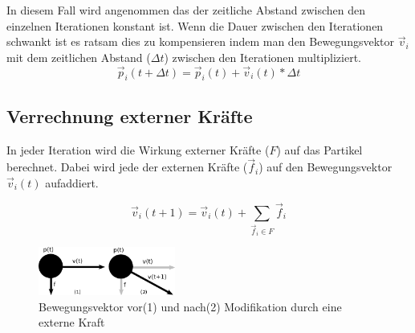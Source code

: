 \begin{Spacing}{\mylinespace}
		In diesem Fall wird angenommen das der zeitliche Abstand zwischen den
		einzelnen Iterationen konstant ist. Wenn die Dauer zwischen den Iterationen
		schwankt ist es ratsam dies zu kompensieren indem man den Bewegungsvektor
		$\vec{v}_{i}$ mit dem zeitlichen Abstand ($\Delta t$) zwischen den
		Iterationen multipliziert.
		 \[ \vec{p}_{i}(t+\Delta t) = \vec{p}_{i}(t) + \vec{v}_{i}(t) * \Delta t\]

    \subsection{Verrechnung externer Kräfte}
        In jeder Iteration wird die Wirkung externer Kräfte ($F$) auf das
        Partikel berechnet. Dabei wird jede der externen Kräfte ($\vec{f}_i$) auf den
        Bewegungsvektor $\vec{v}_{i}(t)$ aufaddiert.

        \[ \vec{v}_{i}(t+1) = \vec{v}_{i}(t) + \sum_{\vec{f}_{i} \in F}{\vec{f}_{i}} \]

		\begin{figure}[h!]
			\centering
			\includegraphics[width=0.4\textwidth]{graphics/Phys_bew12.png}
			\caption{Bewegungsvektor vor(1) und nach(2) Modifikation durch eine externe Kraft }
			\label{fig:ModForce}
		\end{figure}


\end{Spacing}
